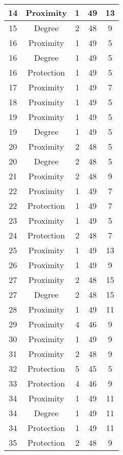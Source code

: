 \documentclass[results.tex]{subfiles}
\begin{document}
\begin{center}
\begin{tabular}{| c || c | c | c | c |}
    \hline
    14 & Proximity & 1 & 49 & 13 \\ 
    \hline
    15 & Degree & 2 & 48 & 9 \\ 
    \hline
    16 & Proximity & 1 & 49 & 5 \\ 
    \hline
    16 & Degree & 1 & 49 & 5 \\ 
    \hline
    16 & Protection & 1 & 49 & 5 \\ 
    \hline
    17 & Proximity & 1 & 49 & 7 \\ 
    \hline
    18 & Proximity & 1 & 49 & 5 \\ 
    \hline
    19 & Proximity & 1 & 49 & 5 \\ 
    \hline
    19 & Degree & 1 & 49 & 5 \\ 
    \hline
    20 & Proximity & 2 & 48 & 5 \\ 
    \hline
    20 & Degree & 2 & 48 & 5 \\ 
    \hline
    21 & Proximity & 2 & 48 & 9 \\ 
    \hline
    22 & Proximity & 1 & 49 & 7 \\ 
    \hline
    22 & Protection & 1 & 49 & 7 \\ 
    \hline
    23 & Proximity & 1 & 49 & 5 \\ 
    \hline
    24 & Protection & 2 & 48 & 7 \\ 
    \hline
    25 & Proximity & 1 & 49 & 13 \\ 
    \hline
    26 & Proximity & 1 & 49 & 9 \\ 
    \hline
    27 & Proximity & 2 & 48 & 15 \\ 
    \hline
    27 & Degree & 2 & 48 & 15 \\ 
    \hline
    28 & Proximity & 1 & 49 & 11 \\ 
    \hline
    29 & Proximity & 4 & 46 & 9 \\ 
    \hline
    30 & Proximity & 1 & 49 & 9 \\ 
    \hline
    31 & Proximity & 2 & 48 & 9 \\ 
    \hline
    32 & Protection & 5 & 45 & 5 \\ 
    \hline
    33 & Protection & 4 & 46 & 9 \\ 
    \hline
    34 & Proximity & 1 & 49 & 11 \\ 
    \hline
    34 & Degree & 1 & 49 & 11 \\ 
    \hline
    34 & Protection & 1 & 49 & 11 \\ 
    \hline
    35 & Protection & 2 & 48 & 9 \\ 

\end{tabular}
\end{center}
\end{document}
